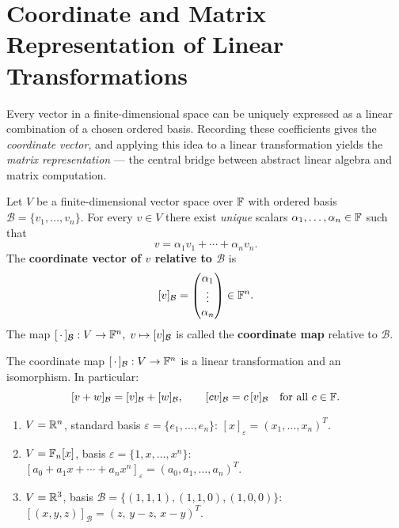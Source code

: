\section{Coordinate and Matrix Representation of Linear Transformations}

Every vector in a finite-dimensional space can be uniquely expressed as a linear
combination of a chosen ordered basis.  Recording these coefficients gives the
\emph{coordinate vector}, and applying this idea to a linear transformation
yields the \emph{matrix representation} — the central bridge between abstract
linear algebra and matrix computation.

\begin{defbox}
\label{def:coordinate-vector}
Let $V$ be a finite-dimensional vector space over $\mathbb{F}$ with ordered basis
$\mathcal{B}=\{v_1,\ldots,v_n\}$.  For every $v\in V$ there exist \emph{unique}
scalars $\alpha_1,\ldots,\alpha_n\in\mathbb{F}$ such that
\[
    v = \alpha_1 v_1 + \cdots + \alpha_n v_n.
\]
The \textbf{coordinate vector of $v$ relative to $\mathcal{B}$} is
\[
    [v]_{\mathcal{B}} =
    \begin{pmatrix}\alpha_1\\\vdots\\\alpha_n\end{pmatrix} \in \mathbb{F}^n.
\]
The map $[\,\cdot\,]_{\mathcal{B}}:V\to\mathbb{F}^n,\; v\mapsto[v]_{\mathcal{B}}$
is called the \textbf{coordinate map} relative to $\mathcal{B}$.
\end{defbox}

\begin{propbox}
\label{prop:coord-iso}
The coordinate map $[\,\cdot\,]_{\mathcal{B}}:V\to\mathbb{F}^n$ is a linear
transformation and an isomorphism.  In particular:
\[
    [v+w]_{\mathcal{B}} = [v]_{\mathcal{B}} + [w]_{\mathcal{B}}, \qquad
    [cv]_{\mathcal{B}} = c\,[v]_{\mathcal{B}} \quad\text{for all }c\in\mathbb{F}.
\]
\end{propbox}

\begin{exbox}
\begin{enumerate}
    \item $V=\mathbb{R}^n$, standard basis $\varepsilon=\{e_1,\ldots,e_n\}$:
          $[x]_\varepsilon=(x_1,\ldots,x_n)^T$.
    \item $V=\mathbb{F}_n[x]$, basis $\varepsilon=\{1,x,\ldots,x^n\}$:
          $[a_0+a_1 x+\cdots+a_n x^n]_\varepsilon=(a_0,a_1,\ldots,a_n)^T$.
    \item $V=\mathbb{R}^3$, basis $\mathcal{B}=\{(1,1,1),(1,1,0),(1,0,0)\}$:
          $[(x,y,z)]_{\mathcal{B}}=(z,\,y-z,\,x-y)^T$.
\end{enumerate}
\end{exbox}

